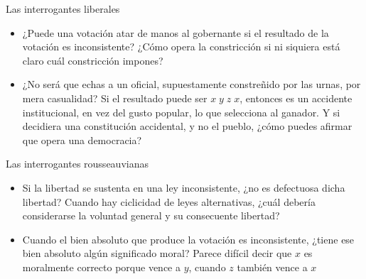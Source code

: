 \documentclass[bigger]{beamer}
\begin{document}
\begin{frame}[label={sec:org40a2db4}]{Las interrogantes liberales}
\begin{itemize}
\item ¿Puede una votación atar de manos al gobernante si el resultado de la votación es inconsistente? ¿Cómo opera la constricción si ni siquiera está claro cuál constricción impones?
\end{itemize}
\pause
\begin{itemize}
\item ¿No será que echas a un oficial, supuestamente constreñido por las urnas, por mera casualidad? Si el resultado puede ser \(x \; y\;  z \; x\), entonces es un accidente institucional, en vez del gusto popular, lo que selecciona al ganador. Y si decidiera una constitución accidental, y no el pueblo,  ¿cómo puedes afirmar que opera una democracia?
\end{itemize}
\end{frame}
\begin{frame}[label={sec:orgd2741ed}]{Las interrogantes rousseauvianas}
\begin{itemize}
\item Si la libertad se sustenta en una ley inconsistente, ¿no es defectuosa dicha libertad? Cuando hay ciclicidad de leyes alternativas, ¿cuál debería considerarse la voluntad general y su consecuente libertad?
\end{itemize}
\pause
\begin{itemize}
\item Cuando el bien absoluto que produce la votación es inconsistente, ¿tiene ese bien absoluto algún significado moral? Parece difícil decir que \(x\) es moralmente correcto porque vence a \(y\), cuando \(z\) también vence a \(x\)
\end{itemize}
\end{frame}
\end{document}
